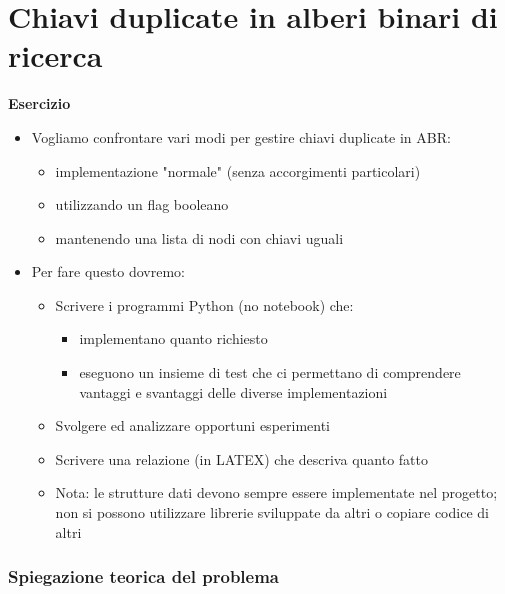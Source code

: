 \part{Chiavi duplicate in alberi binari di ricerca}

\begin{tcolorbox}[colback=lightgray!20,%
                  colframe=black,%
                  arc=3mm, auto outer arc,]
                  
    \textbf{Esercizio}
    \begin{itemize}
    
    \item Vogliamo confrontare vari modi per gestire chiavi duplicate in ABR:
      \begin{itemize}
        \item implementazione "normale" (senza accorgimenti particolari)
        \item utilizzando un flag booleano
        \item mantenendo una lista di nodi con chiavi uguali
      \end{itemize} 
    \item Per fare questo dovremo:
      \begin{itemize}
        \item Scrivere i programmi Python (no notebook) che:
          \begin{itemize}
            \item implementano quanto richiesto
            \item eseguono un insieme di test che ci permettano di comprendere vantaggi e svantaggi delle diverse implementazioni
          \end{itemize}
          \item Svolgere ed analizzare opportuni esperimenti
          \item Scrivere una relazione (in LATEX) che descriva quanto fatto
          \item Nota: le strutture dati devono sempre essere implementate nel progetto; non si possono utilizzare librerie sviluppate da altri o copiare codice di altri
      \end{itemize}
    \end{itemize}
\end{tcolorbox}

\section{Spiegazione teorica del problema}

